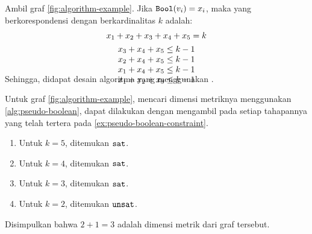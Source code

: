 \begin{example}
	Ambil graf \autoref{fig:algorithm-example}. Jika \(\mathtt{Bool}(v_i) = x_i\), maka  yang berkorespondensi dengan  berkardinalitas \(k\) adalah:
	\[
		\smash[b]{
		\begin{array}{c}
			x_1 + x_2 + x_3 + x_4 + x_5 = k \\ [4pt]
			x_3 + x_4 + x_5 \leq k - 1 \\
			x_2 + x_4 + x_5 \leq k - 1 \\
			x_1 + x_4 + x_5 \leq k - 1 \\
			x_1 + x_2 + x_3 \leq k - 1
		\end{array}
		} \vspace{0.75em}
	\]
	\label{ex:pseudo-boolean-constraint}
\end{example}

\noindent Sehingga, didapat desain algoritma yang menggunakan .

\begin{example}
	Untuk graf \autoref{fig:algorithm-example}, mencari dimensi metriknya menggunakan \autoref{alg:pseudo-boolean}, dapat dilakukan dengan mengambil pada setiap tahapannya  yang telah tertera pada \autoref{ex:pseudo-boolean-constraint}.
	\begin{enumerate}
		\item Untuk \(k = 5\), ditemukan \(\mathtt{sat}\).
		\item Untuk \(k = 4\), ditemukan \(\mathtt{sat}\).
		\item Untuk \(k = 3\), ditemukan \(\mathtt{sat}\).
		\item Untuk \(k = 2\), ditemukan \(\mathtt{unsat}\).
	\end{enumerate}
	Disimpulkan bahwa \(2 + 1 = 3\) adalah dimensi metrik dari graf tersebut.
\end{example}

\vspace{-1em}

